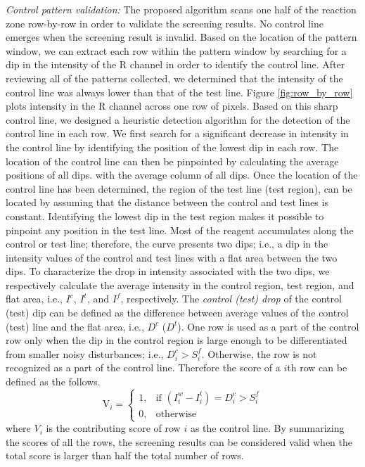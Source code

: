 \emph{Control pattern validation: }
The proposed algorithm scans one half of the reaction zone row-by-row in order to validate the screening results. No control line emerges when the screening result is invalid. Based on the location of the pattern window, we can extract each row within the pattern window by searching for a dip in the intensity of the R channel in order to identify the control line. After reviewing all of the patterns collected, we determined that the intensity of the control line was always lower than that of the test line. Figure \ref{fig:row_by_row} plots intensity in the R channel across one row of pixels. Based on this sharp control line, we designed a heuristic detection algorithm for the detection of the control line in each row. We first search for a significant decrease in intensity in the control line by identifying the position of the lowest dip in each row. The location of the control line can then be pinpointed by calculating the average positions of all dips. with the average column of all dips. Once the location of the control line has been determined, the region of the test line (test region), can be located by assuming that the distance between the control and test lines is constant. Identifying the lowest dip in the test region makes it possible to pinpoint any position in the test line. Most of the reagent accumulates along the control or test line; therefore, the curve presents two dips; i.e., a dip in the intensity values of the control and test lines with a flat area between the two dips. To characterize the drop in intensity associated with the two dips, we respectively calculate the average intensity in the control region, test region, and flat area, i.e., $I^c$, $I^t$, and $I^f$, respectively. The \emph{control (test) drop} of the control (test) dip can be defined as the difference between average values of the control (test) line and the flat area, i.e., $D^c$ ($D^t$). One row is used as a part of the control row only when the dip in the control region is large enough to be differentiated from smaller noisy disturbances; i.e., $D^c_i > S^f_i$. Otherwise, the row is not recognized as a part of the control line. Therefore the score of a $i$th row can be defined as the follows.
\begin{equation}
\label{eq:row_detect}
\text{V}_i = \begin{cases}
1, &\mbox{if } (I^w_i - I^t_i) = D^c_i > S^f_i \\
0, &\mbox{otherwise }
\end{cases}
\end{equation}
where $V_i$ is the contributing score of row $i$ as the control line. By summarizing the scores of all the rows, the screening results can be considered valid when the total score is larger than half the total number of rows.


